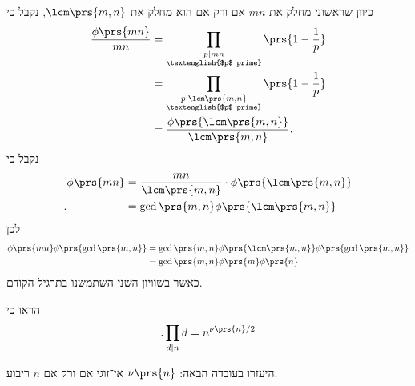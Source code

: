 \documentclass[a4paper,10pt,twoside,openany]{book}
\begin{document}
\begin{solution}
כיוון שראשוני מחלק את
$mn$
אם ורק אם הוא מחלק את
$\lcm\prs{m,n}$,
נקבל כי
\begin{align*}
\frac{\phi\prs{mn}}{mn} &= \prod_{\substack{p \mid mn \\ \text{\textenglish{$p$ prime}}}} \prs{1 - \frac{1}{p}}
\\&=
\prod_{\substack{p \mid \lcm\prs{m,n} \\ \text{\textenglish{$p$ prime}}}} \prs{1 - \frac{1}{p}}
\\&=
\frac{\phi\prs{\lcm\prs{m,n}}}{\lcm\prs{m,n}} \text{.}
\end{align*}
נקבל כי
\begin{align*}
\phi\prs{mn} &= \frac{mn}{\lcm\prs{m,n}} \cdot \phi\prs{\lcm\prs{m,n}}
\\ \text{.}\hphantom{\phi\prs{mn}} &= \gcd\prs{m,n} \phi\prs{\lcm\prs{m,n}}
\end{align*}
לכן
\begin{align*}
\phi\prs{mn} \phi\prs{\gcd\prs{m,n}} &= \gcd\prs{m,n} \phi\prs{\lcm\prs{m,n}} \phi\prs{\gcd\prs{m,n}}
\\&= \gcd\prs{m,n} \phi\prs{m} \phi\prs{n}
\end{align*}
כאשר בשוויון השני השתמשנו בתרגיל הקודם.
\end{solution}

\begin{exercisechap}
הראו כי
\[\text{.} \prod_{d \mid n} d = n^{\nu\prs{n} / 2}\]

היעזרו בעובדה הבאה:
$\nu\prs{n}$
אי־זוגי אם ורק אם
$n$
ריבוע.
\end{exercisechap}
\end{document}
